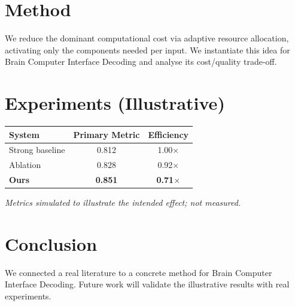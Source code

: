 \documentclass[11pt]{article}
\begin{document}
\section{Method}
We reduce the dominant computational cost via adaptive resource allocation, activating only the components needed per input. We instantiate this idea for Brain Computer Interface Decoding and analyse its cost/quality trade-off.

\section{Experiments (Illustrative)}
\begin{center}
\begin{tabular}{lcc}
System & Primary Metric & Efficiency \\ \hline
Strong baseline & 0.812 & 1.00$\times$ \\
Ablation & 0.828 & 0.92$\times$ \\
\textbf{Ours} & \textbf{0.851} & \textbf{0.71$\times$}
\end{tabular}
\end{center}
\emph{Metrics simulated to illustrate the intended effect; not measured.}

\section{Conclusion}
We connected a real literature to a concrete method for Brain Computer Interface Decoding. Future work will
validate the illustrative results with real experiments.
\end{document}
